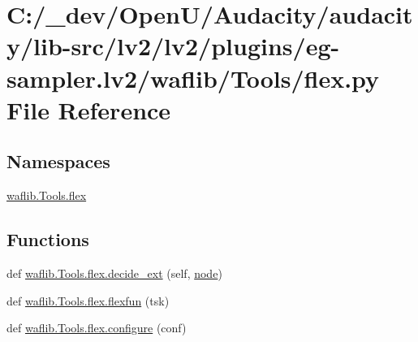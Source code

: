 \hypertarget{lv2_2plugins_2eg-sampler_8lv2_2waflib_2_tools_2flex_8py}{}\section{C\+:/\+\_\+dev/\+Open\+U/\+Audacity/audacity/lib-\/src/lv2/lv2/plugins/eg-\/sampler.lv2/waflib/\+Tools/flex.py File Reference}
\label{lv2_2plugins_2eg-sampler_8lv2_2waflib_2_tools_2flex_8py}
\subsection*{Namespaces}
\begin{DoxyCompactItemize}
\item 
 \hyperlink{namespacewaflib_1_1_tools_1_1flex}{waflib.\+Tools.\+flex}
\end{DoxyCompactItemize}
\subsection*{Functions}
\begin{DoxyCompactItemize}
\item 
def \hyperlink{namespacewaflib_1_1_tools_1_1flex_aac8b14ed3ea22ad22a4ead7f11b8667d}{waflib.\+Tools.\+flex.\+decide\+\_\+ext} (self, \hyperlink{structnode}{node})
\item 
def \hyperlink{namespacewaflib_1_1_tools_1_1flex_aed89723ff6789a05a9e312ca0ddb1acf}{waflib.\+Tools.\+flex.\+flexfun} (tsk)
\item 
def \hyperlink{namespacewaflib_1_1_tools_1_1flex_af98941bb6505104e007e22e2be6da162}{waflib.\+Tools.\+flex.\+configure} (conf)
\end{DoxyCompactItemize}
